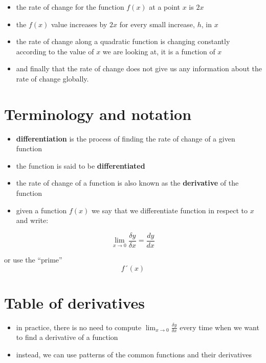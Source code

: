 \documentclass[
]{book}
\providecommand{\tightlist}{%
  \setlength{\itemsep}{0pt}\setlength{\parskip}{0pt}}
\theoremstyle{definition}
\theoremstyle{definition}
\theoremstyle{definition}
\theoremstyle{remark}
\begin{document}
\begin{itemize}
\tightlist
\item
  the rate of change for the function \(f(x)\) at a point \(x\) is \(2x\)
\item
  the \(f(x)\) value increases by \(2x\) for every small increase, \(h\), in \(x\)
\item
  the rate of change along a quadratic function is changing constantly according to the value of \(x\) we are looking at, it is a function of \(x\)
\item
  and finally that the rate of change does not give us any information about the rate of change globally.
\end{itemize}

\hypertarget{terminology-and-notation}{%
\section{Terminology and notation}\label{terminology-and-notation}}

\begin{itemize}
\tightlist
\item
  \textbf{differentiation} is the process of finding the rate of change of a given function
\item
  the function is said to be \textbf{differentiated}
\item
  the rate of change of a function is also known as the \textbf{derivative} of the function
\item
  given a function \(f(x)\) we say that we differentiate function in respect to \(x\) and write:
\end{itemize}

\[\lim_{x\to0}\frac{\delta y}{\delta x}= \frac{dy}{dx}\]

or use the ``prime'' \[f´(x)\]

\hypertarget{table-of-derivatives}{%
\section{Table of derivatives}\label{table-of-derivatives}}

\begin{itemize}
\tightlist
\item
  in practice, there is no need to compute \(\lim_{x\to0}\frac{\delta y}{\delta x}\) every time when we want to find a derivative of a function
\item
  instead, we can use patterns of the common functions and their derivatives
\end{itemize}
\end{document}
